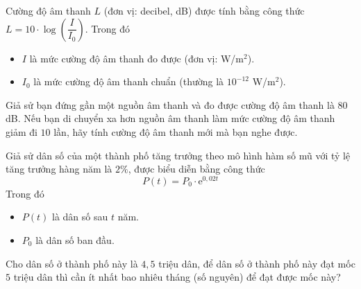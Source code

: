 \begin{ex}%
	Cường độ âm thanh $L$ (đơn vị: decibel, dB) được tính bằng công thức \break $L=10\cdot\log\left(\dfrac{I}{I_0}\right)$.	Trong đó
	\begin{itemize}
		\item $I$ là mức cường độ âm thanh đo được (đơn vị: W/m$^2$).
		\item $I_0$ là mức cường độ âm thanh chuẩn (thường là $10^{-12}$ W/m$^2$).
	\end{itemize}
	Giả sử bạn đứng gần một nguồn âm thanh và đo được cường độ âm thanh là $80$ dB. Nếu bạn di chuyển xa hơn nguồn âm thanh làm mức cường độ âm thanh giảm đi $10$ lần, hãy tính cường độ âm thanh mới mà bạn nghe được.
\end{ex}

\begin{ex}%
	Giả sử dân số của một thành phố tăng trưởng theo mô hình hàm số mũ với tỷ lệ tăng trưởng hàng năm là $2\%$, được biểu diễn bằng công thức
	$$P(t)=P_0\cdot \mathrm{e}^{0{,}02t}$$
	Trong đó
	\begin{itemize}
		\item $P(t)$ là dân số sau $t$ năm.
		\item $P_0$ là dân số ban đầu.
	\end{itemize}
	Cho dân số ở thành phố này là $4{,}5$ triệu dân, để dân số ở thành phố này đạt mốc $5$ triệu dân thì cần ít nhất bao nhiêu tháng (số nguyên) để đạt được mốc này?
\end{ex}

